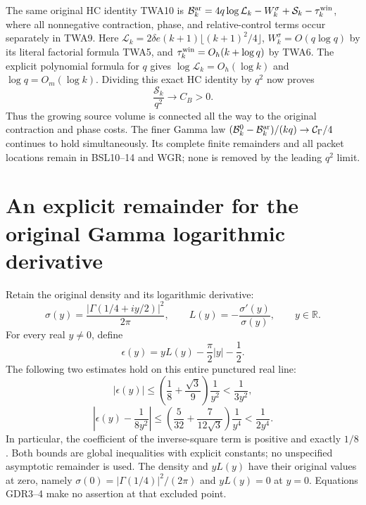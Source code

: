 \documentclass[11pt,a4paper]{article}
\begin{document}
The same original HC identity TWA10 is
$\mathcal B_k^{\rm ar}=4q\log\mathcal L_k-W_k^\sigma
 +\mathcal S_k-\tau_k^{\rm win}$, where all nonnegative contraction,
phase, and relative-control terms occur separately in TWA9.
Here $\mathcal L_k=2\delta e(k+1)\lfloor(k+1)^2/4\rfloor$,
$W_k^\sigma=O(q\log q)$ by its literal factorial formula TWA5,
and $\tau_k^{\rm win}=O_h(k+\log q)$ by TWA6.
The explicit polynomial formula for $q$ gives
$\log\mathcal L_k=O_h(\log k)$ and $\log q=O_m(\log k)$.
Dividing this exact HC identity by $q^2$ now proves
\[
 \boxed{\frac{\mathcal S_k}{q^2}\longrightarrow C_B>0.}
 \tag{BSL22}
\]
Thus the growing source volume is connected all the way to the
original contraction and phase costs. The finer Gamma law
$(\mathcal B_k^0-\mathcal B_k^{\rm ar})/(kq)
 \to\mathcal C_\Gamma/4$ continues to hold simultaneously.
Its complete finite remainders and all packet locations remain
in BSL10--14 and WGR; none is removed by the leading $q^2$ limit.



\section{An explicit remainder for the original Gamma logarithmic derivative}
\label{sec:GDR}

Retain the original density and its logarithmic derivative:
\[
 \sigma(y)=\frac{|\Gamma(1/4+iy/2)|^2}{2\pi},\qquad
 L(y)=-\frac{\sigma'(y)}{\sigma(y)},\qquad y\in\mathbb R.
 \tag{GDR1}
\]
For every real $y\ne0$, define
\[
 \epsilon(y)=yL(y)-\frac\pi2|y|-\frac12.
 \tag{GDR2}
\]
The following two estimates hold on this entire punctured real line:
\[
 \boxed{\displaystyle
 |\epsilon(y)|\le
 \left(\frac18+\frac{\sqrt3}{9}\right)\frac1{y^2}
 <\frac1{3y^2},}
 \tag{GDR3}
\]
\[
 \boxed{\displaystyle
 \left|\epsilon(y)-\frac1{8y^2}\right|
 \le\left(\frac5{32}+\frac7{12\sqrt3}\right)\frac1{y^4}
 <\frac1{2y^4}.}
 \tag{GDR4}
\]
In particular, the coefficient of the inverse-square term is positive
and exactly $1/8$. Both bounds are global inequalities with explicit
constants; no unspecified asymptotic remainder is used. The density
and $yL(y)$ have their original values at zero, namely
$\sigma(0)=|\Gamma(1/4)|^2/(2\pi)$ and $yL(y)=0$ at $y=0$.
Equations GDR3--4 make no assertion at that excluded point.
\end{document}
